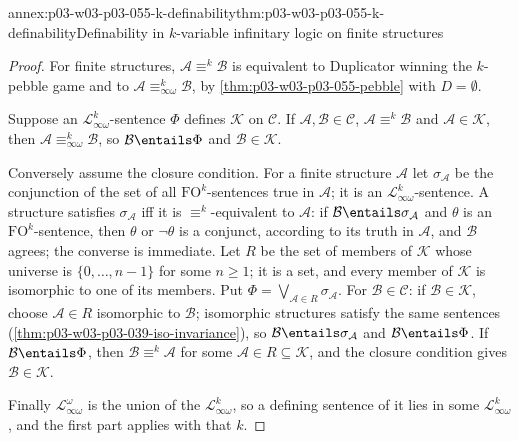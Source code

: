 \begin{annexitem}{annex:p03-w03-p03-055-k-definability}{thm:p03-w03-p03-055-k-definability}{Definability in \(k\)-variable infinitary logic on finite structures}
\begin{proof}
For finite structures, \(\mathcal A\equiv^k\mathcal B\) is equivalent to
Duplicator winning the \(k\)-pebble game and to
\(\mathcal A\equiv^k_{\infty\omega}\mathcal B\), by
\cref{thm:p03-w03-p03-055-pebble} with \(D=\emptyset\).

Suppose an \(\mathcal L^k_{\infty\omega}\)-sentence \(\Phi\) defines
\(\mathcal K\) on \(\mathcal C\). If \(\mathcal A,\mathcal B\in\mathcal C\),
\(\mathcal A\equiv^k\mathcal B\) and \(\mathcal A\in\mathcal K\), then
\(\mathcal A\equiv^k_{\infty\omega}\mathcal B\), so \(\mathcal B\entails\Phi\)
and \(\mathcal B\in\mathcal K\).

Conversely assume the closure condition. For a finite structure
\(\mathcal A\) let \(\sigma_{\mathcal A}\) be the conjunction of the set of
all \(\mathrm{FO}^k\)-sentences true in \(\mathcal A\); it is an
\(\mathcal L^k_{\infty\omega}\)-sentence. A structure satisfies
\(\sigma_{\mathcal A}\) iff it is \(\equiv^k\)-equivalent to \(\mathcal A\):
if \(\mathcal B\entails\sigma_{\mathcal A}\) and \(\theta\) is an
\(\mathrm{FO}^k\)-sentence, then \(\theta\) or \(\neg\theta\) is a conjunct,
according to its truth in \(\mathcal A\), and \(\mathcal B\) agrees; the
converse is immediate. Let \(R\) be the set of members of \(\mathcal K\)
whose universe is \(\{0,\ldots,n-1\}\) for some \(n\ge1\); it is a set, and
every member of \(\mathcal K\) is isomorphic to one of its members. Put
\(\Phi=\bigvee_{\mathcal A\in R}\sigma_{\mathcal A}\). For
\(\mathcal B\in\mathcal C\): if \(\mathcal B\in\mathcal K\), choose
\(\mathcal A\in R\) isomorphic to \(\mathcal B\); isomorphic structures
satisfy the same sentences (\cref{thm:p03-w03-p03-039-iso-invariance}), so
\(\mathcal B\entails\sigma_{\mathcal A}\) and \(\mathcal B\entails\Phi\). If
\(\mathcal B\entails\Phi\), then \(\mathcal B\equiv^k\mathcal A\) for some
\(\mathcal A\in R\subseteq\mathcal K\), and the closure condition gives
\(\mathcal B\in\mathcal K\).

Finally \(\mathcal L^\omega_{\infty\omega}\) is the union of the
\(\mathcal L^k_{\infty\omega}\), so a defining sentence of it lies in some
\(\mathcal L^k_{\infty\omega}\), and the first part applies with that \(k\).
\end{proof}
\end{annexitem}

